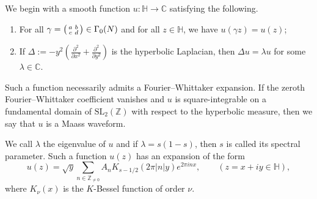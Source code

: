 \documentclass[12pt]{amsart}
\theoremstyle{definition}
\theoremstyle{plain}
\numberwithin{equation}{section}
\begin{document}
We begin with a smooth function $u \colon \mathbb{H} \to \mathbb{C}$ satisfying the following.
\begin{enumerate}
	\item For all $\gamma = \begin{psmallmatrix} a & b \\ c& d \end{psmallmatrix} \in \Gamma_0(N)$ and for all $z \in \mathbb{H}$, we have $u(\gamma z)=u(z)$;
	\item If $\Delta := -y^2\left( \frac{\partial^2}{\partial x^2}+\frac{\partial^2}{\partial y^2}\right)$ is the hyperbolic Laplacian, then $\Delta u = \lambda u$ for some $\lambda \in \mathbb{C}$.
\end{enumerate}
Such a function necessarily admits a Fourier--Whittaker expansion. If the zeroth Fourier--Whittaker coefficient vanishes and $u$ is square-integrable on a fundamental domain of $\text{SL}_2(\mathbb{Z})$ with respect to the hyperbolic measure, then we say that $u$ is a Maass waveform. 

We call $\lambda$ the eigenvalue of $u$ and if $\lambda = s(1-s)$, then $s$ is called its spectral parameter.
Such a function $u(z)$ has an expansion of the form 
\begin{equation}\label{eqn: maass} u(z) = \sqrt{y}\sum_{n \in \mathbb{Z}_{\neq 0}} A_n K_{s-1/2}(2\pi |n| y) e^{2\pi i nx}, \quad \quad (z = x+iy \in \mathbb{H}),
\end{equation}
where $K_\nu(x)$ is the $K$-Bessel function of order $\nu$.
\end{document}

